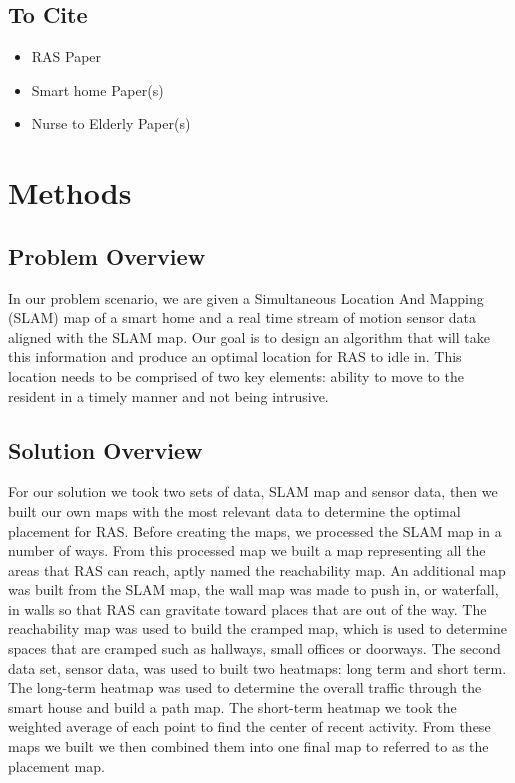 \documentclass[11pt, conference, a4paper]{IEEEtran}
\begin{document}
\subsection{To Cite}
\begin{itemize}
    \item RAS Paper
    \item Smart home Paper(s)
    \item Nurse to Elderly Paper(s)
\end{itemize}


\section{Methods}


\subsection{Problem Overview}
In our problem scenario, we are given a Simultaneous Location And Mapping (SLAM) map of a smart home and a real time stream of motion sensor data aligned with the SLAM map. Our goal is to design an algorithm that will take this information and produce an optimal location for RAS to idle in. This location needs to be comprised of two key elements: ability to move to the resident in a timely manner and not being intrusive. 


\subsection{Solution Overview}
For our solution we took two sets of data, SLAM map and sensor data, then we built our own maps with the most relevant data to determine the optimal placement for RAS. Before creating the maps, we processed the SLAM map in a number of ways. From this processed map we built a map representing all the areas that RAS can reach, aptly named the reachability map. An additional map was built from the SLAM map, the wall map was made to push in, or waterfall, in walls so that RAS can gravitate toward places that are out of the way. The reachability map was used to build the cramped map, which is used to determine spaces that are cramped such as hallways, small offices or doorways.
The second data set, sensor data, was used to built two heatmaps: long term and short term. The long-term heatmap was used to determine the overall traffic through the smart house and build a path map. The short-term heatmap we took the weighted average of each point to find the center of recent activity.
From these maps we built we then combined them into one final map to referred to as the placement map. 
\end{document}
